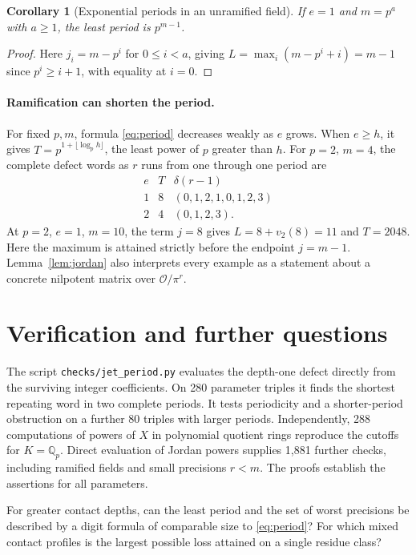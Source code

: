 \documentclass[11pt,letterpaper]{article}
\newtheorem{corollary}[theorem]{Corollary}
\newcommand{\OO}{\mathcal O}
\newcommand{\QQ}{\mathbb Q}
\begin{document}
\begin{corollary}[Exponential periods in an unramified field]\label{cor:power}
If $e=1$ and $m=p^a$ with $a\ge1$, the least period is $p^{m-1}$.
\end{corollary}
\begin{proof}
Here $j_i=m-p^i$ for $0\le i<a$, giving $L=\max_i(m-p^i+i)=m-1$ since $p^i\ge i+1$, with equality at $i=0$.
\end{proof}

\paragraph{Ramification can shorten the period.}
For fixed $p,m$, formula \eqref{eq:period} decreases weakly as $e$ grows. When $e\ge h$, it gives $T=p^{1+\lfloor\log_p h\rfloor}$, the least power of $p$ greater than $h$. For $p=2$, $m=4$, the complete defect words as $r$ runs from one through one period are
\[
\begin{array}{ccl}
e&T&\delta(r-1)\\ \hline
1&8&(0,1,2,1,0,1,2,3)\\
2&4&(0,1,2,3).
\end{array}
\]
At $p=2$, $e=1$, $m=10$, the term $j=8$ gives $L=8+v_2(8)=11$ and $T=2048$. Here the maximum is attained strictly before the endpoint $j=m-1$. Lemma~\ref{lem:jordan} also interprets every example as a statement about a concrete nilpotent matrix over $\OO/\pi^r$.



\section{Verification and further questions}
The script \texttt{checks/jet\_period.py} evaluates the depth-one defect directly from the surviving integer coefficients. On 280 parameter triples it finds the shortest repeating word in two complete periods. It tests periodicity and a shorter-period obstruction on a further 80 triples with larger periods. Independently, 288 computations of powers of $X$ in polynomial quotient rings reproduce the cutoffs for $K=\QQ_p$. Direct evaluation of Jordan powers supplies 1,881 further checks, including ramified fields and small precisions $r<m$. The proofs establish the assertions for all parameters.

For greater contact depths, can the least period and the set of worst precisions be described by a digit formula of comparable size to \eqref{eq:period}? For which mixed contact profiles is the largest possible loss attained on a single residue class?
\end{document}
